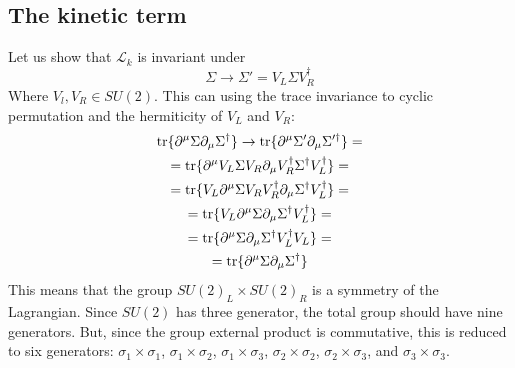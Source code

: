 \documentclass{article}
\begin{document}
\subsection{The kinetic term}
Let us show that $\mathcal{L}_k$ is invariant under 
\begin{equation}
    \Sigma \rightarrow \Sigma' = V_L \Sigma V_R^\dagger
\end{equation}
Where $V_l, V_R \in SU(2)$. This can using the trace invariance to cyclic permutation and the hermiticity of $V_L$ and $V_R$:
\begin{equation}
\begin{gathered}
    \tr\{\partial^\mu\Sigma\partial_\mu\Sigma^\dagger\} \rightarrow \tr\{\partial^\mu\Sigma'\partial_\mu\Sigma'^\dagger\}
    = \\ =
    \tr\{\partial^\mu V_L\Sigma V_R \partial_\mu V_R^\dagger \Sigma^\dagger V_L^\dagger\} = \\ =
    \tr\{V_L \partial^\mu \Sigma V_R V_R^\dagger \partial_\mu \Sigma^\dagger V_L^\dagger\} = \\ =
    \tr\{V_L \partial^\mu \Sigma \partial_\mu \Sigma^\dagger V_L^\dagger\} = \\ =
    \tr\{\partial^\mu \Sigma \partial_\mu \Sigma^\dagger V_L^\dagger V_L\} = \\ =
    \tr\{\partial^\mu \Sigma \partial_\mu \Sigma^\dagger\}
\end{gathered}
\end{equation}
This means that the group $SU(2)_L \times SU(2)_R$ is a symmetry of the Lagrangian. Since $SU(2)$ has three generator, the total group should have nine generators. But, since the group external product is commutative, this is reduced to six generators: $\sigma_1 \times \sigma_1$, $\sigma_1 \times \sigma_2$, $\sigma_1 \times \sigma_3$, $\sigma_2 \times \sigma_2$, $\sigma_2 \times \sigma_3$, and $\sigma_3 \times \sigma_3$.
\end{document}
